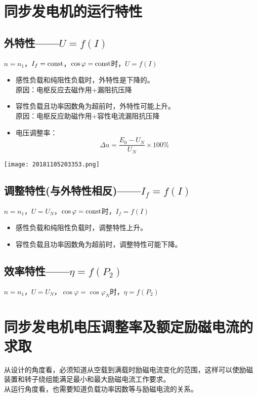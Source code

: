 \documentclass[blue]{elegantnote}
\begin{document}
\section{同步发电机的运行特性}
\subsection{外特性——$U=f(I)$}
$n=n_1$，$I_f=\rm{const}$，$\cos\varphi=\rm{const}$时，$U=f(I)$
\begin{itemize}
	\item 感性负载和纯阻性负载时，外特性是下降的。\\
	原因：电枢反应去磁作用+漏阻抗压降
	\item 容性负载且功率因数角为超前时，外特性可能上升。\\
	原因：电枢反应助磁作用+容性电流漏阻抗压降
	\item 电压调整率：
	$$\Delta u=\frac{E_0-U_N}{U_N}\times100\%$$
\end{itemize}
	\begin{center}  
	\texttt{[image: 20181105203353.png]}
	\end{center}  

\subsection{调整特性(与外特性相反)——$I_f=f(I)$}
$n=n_1$，$U=U_N$，$\cos\varphi=\rm{const}$时，$I_f=f(I)$
\begin{itemize}
	\item 感性负载和纯阻性负载时，调整特性上升。
	\item 容性负载且功率因数角为超前时，调整特性可能下降。
\end{itemize}
\subsection{效率特性——$\eta=f(P_2)$}
$n=n_1$，$U=U_N$，$\cos\varphi=\cos\varphi_N$时，$\eta=f(P_2)$

\section{同步发电机电压调整率及额定励磁电流的求取}
从设计的角度看，必须知道从空载到满载时励磁电流变化的范围，这样可以使励磁装置和转子绕组能满足最小和最大励磁电流工作要求。\\
\indent 从运行角度看，也需要知道负载功率因数等与励磁电流的关系。
\end{document}
